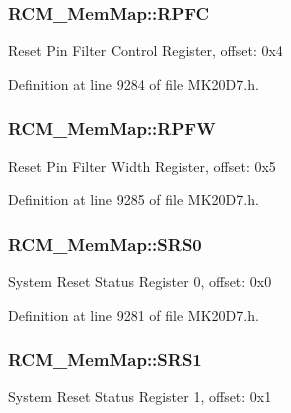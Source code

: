 \subsubsection[{\texorpdfstring{R\+P\+FC}{RPFC}}]{ R\+C\+M\+\_\+\+Mem\+Map\+::\+R\+P\+FC}\hypertarget{struct_r_c_m___mem_map_ace89c039f8342f8b5dd26c3c7b8309a2}{}\label{struct_r_c_m___mem_map_ace89c039f8342f8b5dd26c3c7b8309a2}
Reset Pin Filter Control Register, offset\+: 0x4 

Definition at line 9284 of file M\+K20\+D7.\+h.

\subsubsection[{\texorpdfstring{R\+P\+FW}{RPFW}}]{ R\+C\+M\+\_\+\+Mem\+Map\+::\+R\+P\+FW}\hypertarget{struct_r_c_m___mem_map_ac458f95f6aa234285f568694a5b8240d}{}\label{struct_r_c_m___mem_map_ac458f95f6aa234285f568694a5b8240d}
Reset Pin Filter Width Register, offset\+: 0x5 

Definition at line 9285 of file M\+K20\+D7.\+h.

\subsubsection[{\texorpdfstring{S\+R\+S0}{SRS0}}]{ R\+C\+M\+\_\+\+Mem\+Map\+::\+S\+R\+S0}\hypertarget{struct_r_c_m___mem_map_aa28b91bdb2e1acc454f7bcb9ad26efb7}{}\label{struct_r_c_m___mem_map_aa28b91bdb2e1acc454f7bcb9ad26efb7}
System Reset Status Register 0, offset\+: 0x0 

Definition at line 9281 of file M\+K20\+D7.\+h.

\subsubsection[{\texorpdfstring{S\+R\+S1}{SRS1}}]{ R\+C\+M\+\_\+\+Mem\+Map\+::\+S\+R\+S1}\hypertarget{struct_r_c_m___mem_map_a8e7926e6f51e64e63e5ed3adb7aee612}{}\label{struct_r_c_m___mem_map_a8e7926e6f51e64e63e5ed3adb7aee612}
System Reset Status Register 1, offset\+: 0x1 

